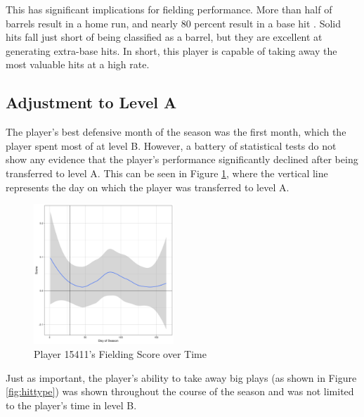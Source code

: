 This has significant implications for fielding performance. More than half of barrels result in a home run, and nearly 80 percent result in a base hit \cite{metzelaar}. Solid hits fall just short of being classified as a barrel, but they are excellent at generating extra-base hits. In short, this player is capable of taking away the most valuable hits at a high rate.

\subsection{Adjustment to Level A}
\label{sec:adjustment}

The player's best defensive month of the season was the first month, which the player spent most of at level B. However, a battery of statistical tests do not show any evidence that the player's performance significantly declined after being transferred to level A. This can be seen in Figure \ref{fig:scores}, where the vertical line represents the day on which the player was transferred to level A.

\begin{figure}[htb]
    \includegraphics[width = 0.47\textwidth]{../../output/figs/score_plot_15411.png}
    \caption{Player 15411's Fielding Score over Time}
    \label{fig:scores}
\end{figure}

Just as important, the player's ability to take away big plays (as shown in Figure \ref{fig:hittype}) was shown throughout the course of the season and was not limited to the player's time in level B.